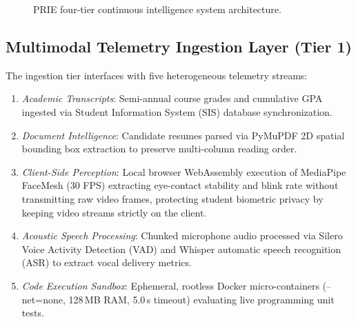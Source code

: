 \documentclass[conference]{IEEEtran}
\begin{document}
\begin{figure}[htbp]
\centering
{}
\caption{PRIE four-tier continuous intelligence system architecture.}
\label{fig1}
\end{figure}

\subsection{Multimodal Telemetry Ingestion Layer (Tier 1)}
The ingestion tier interfaces with five heterogeneous telemetry streams:
\begin{enumerate}
\item \textit{Academic Transcripts}: Semi-annual course grades and cumulative GPA ingested via Student Information System (SIS) database synchronization.
\item \textit{Document Intelligence}: Candidate resumes parsed via PyMuPDF 2D spatial bounding box extraction to preserve multi-column reading order.
\item \textit{Client-Side Perception}: Local browser WebAssembly execution of MediaPipe FaceMesh (30 FPS) extracting eye-contact stability and blink rate without transmitting raw video frames, protecting student biometric privacy by keeping video streams strictly on the client.
\item \textit{Acoustic Speech Processing}: Chunked microphone audio processed via Silero Voice Activity Detection (VAD) and Whisper automatic speech recognition (ASR) to extract vocal delivery metrics.
\item \textit{Code Execution Sandbox}: Ephemeral, rootless Docker micro-containers (--net=none, 128\,MB RAM, 5.0\,s timeout) evaluating live programming unit tests.
\end{enumerate}
\end{document}
